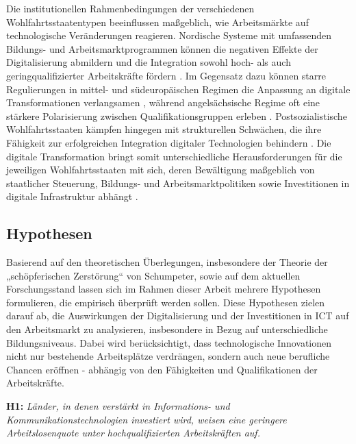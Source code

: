 Die institutionellen Rahmenbedingungen der verschiedenen Wohlfahrtsstaatentypen beeinflussen 
maßgeblich, wie Arbeitsmärkte auf technologische Veränderungen reagieren. Nordische Systeme 
mit umfassenden Bildungs- und Arbeitsmarktprogrammen können die negativen Effekte der 
Digitalisierung abmildern und die Integration sowohl hoch- als auch geringqualifizierter 
Arbeitskräfte fördern \parencite[S. 27–30]{espingandersen1990thethree}. Im Gegensatz dazu 
können starre Regulierungen in mittel- und südeuropäischen Regimen die Anpassung an 
digitale Transformationen verlangsamen \parencite[S. 155]{ferrera1996thesouthern}, während 
angelsächsische Regime oft eine stärkere Polarisierung zwischen Qualifikationsgruppen 
erleben \parencite[S. 3–5]{hall2001varieties}. Postsozialistische Wohlfahrtsstaaten 
kämpfen hingegen mit strukturellen Schwächen, die ihre Fähigkeit zur erfolgreichen 
Integration digitaler Technologien behindern \parencite[S. 88–93]{cerami2006socialpolicy}. 
Die digitale Transformation bringt somit unterschiedliche Herausforderungen für die 
jeweiligen Wohlfahrtsstaaten mit sich, deren Bewältigung maßgeblich von staatlicher 
Steuerung, Bildungs- und Arbeitsmarktpolitiken sowie Investitionen in digitale 
Infrastruktur abhängt \parencite[S. 23]{oecd2020digital}.



\subsection{Hypothesen}

Basierend auf den theoretischen Überlegungen, insbesondere der Theorie der „schöpferischen 
Zerstörung“ von Schumpeter, sowie auf dem aktuellen Forschungsstand lassen sich im Rahmen 
dieser Arbeit mehrere Hypothesen formulieren, die empirisch überprüft werden sollen. Diese 
Hypothesen zielen darauf ab, die Auswirkungen der Digitalisierung und der Investitionen in 
\ac{ICT} auf den Arbeitsmarkt zu analysieren, insbesondere in Bezug auf unterschiedliche 
Bildungsniveaus. Dabei wird berücksichtigt, dass technologische Innovationen nicht nur 
bestehende Arbeitsplätze verdrängen, sondern auch neue berufliche Chancen eröffnen - 
abhängig von den Fähigkeiten und Qualifikationen der Arbeitskräfte.

\textbf{H1:} \textit{ Länder, in denen verstärkt in Informations- und Kommunikationstechnologien 
investiert wird, weisen eine geringere Arbeitslosenquote unter hochqualifizierten 
Arbeitskräften auf.}

